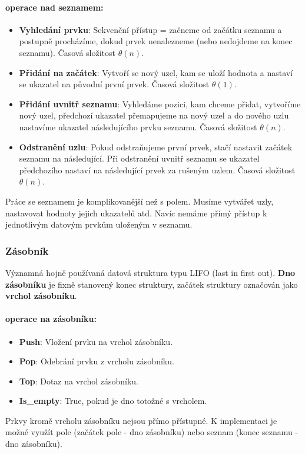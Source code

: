\documentclass[10pt,a4paper]{article}
\begin{document}
\paragraph{operace nad seznamem:}
\begin{itemize}
	\item \textbf{Vyhledání prvku}: Sekvenční přístup = začneme od začátku seznamu a postupně procházíme, dokud prvek nenalezneme (nebo nedojdeme na konec seznamu). Časová složitost $\theta (n)$.
	\item \textbf{Přidání na začátek}: Vytvoří se nový uzel, kam se uloží hodnota a nastaví se ukazatel na původní první prvek. Časová složitost $\theta (1)$.
	\item \textbf{Přidání uvnitř seznamu}: Vyhledáme pozici, kam chceme přidat, vytvoříme nový uzel, předchozí ukazatel přemapujeme na nový uzel a do nového uzlu nastavíme ukazatel následujícího prvku seznamu. Časová složitost $\theta (n)$.
	\item \textbf{Odstranění uzlu}: Pokud odstraňujeme první prvek, stačí nastavit začátek seznamu na následující. Při odstranění uvnitř seznamu se ukazatel předchozího nastaví na následující prvek za rušeným uzlem. Časová složitost $\theta (n)$.
\end{itemize}
Práce se seznamem je komplikovanější než s polem. Musíme vytvářet uzly, nastavovat hodnoty jejich ukazatelů atd. Navíc nemáme přímý přístup k jednotlivým datovým prvkům uloženým v seznamu.
\subsubsection{Zásobník}
Významná hojně používaná datová struktura typu LIFO (last in first out). \textbf{Dno zásobníku} je fixně stanovený konec struktury, začátek struktury označován jako \textbf{vrchol zásobníku}.
\paragraph{operace na zásobníku:}
\begin{itemize}
	\item \textbf{Push}: Vložení prvku na vrchol zásobníku.
	\item \textbf{Pop}: Odebrání prvku z vrcholu zásobníku.
	\item \textbf{Top}: Dotaz na vrchol zásobníku.
	\item \textbf{Is\_empty}: True, pokud je dno totožné s vrcholem.
\end{itemize}
Prkvy kromě vrcholu zásobníku nejsou přímo přístupné. K implementaci je možné využít pole (začátek pole - dno zásobníku) nebo seznam (konec seznamu - dno zásobníku).
\end{document}
